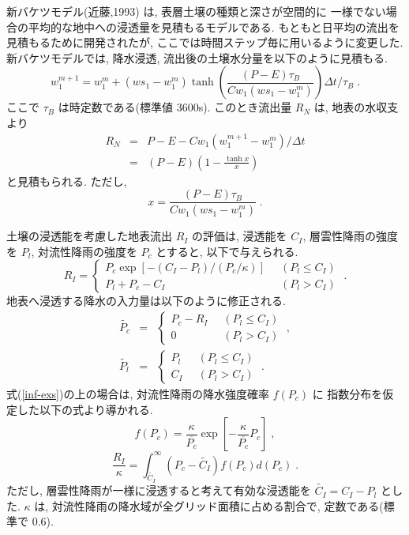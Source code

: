 新バケツモデル(近藤,1993) は, 表層土壌の種類と深さが空間的に
一様でない場合の平均的な地中への浸透量を見積もるモデルである. 
もともと日平均の流出を見積もるために開発されたが, 
ここでは時間ステップ毎に用いるように変更した. 
%
新バケツモデルでは, 降水浸透, 流出後の土壌水分量を以下のように見積もる. 
\begin{equation}
w_1^{m+1} = w_1^m + ( ws_1 - w_1^m ) 
\tanh\left( \frac{(P-E)\tau_B}{Cw_1(ws_1 - w_1^m)} \right) 
\Delta t / \tau_B \; .
\end{equation}
ここで $\tau_B$ は時定数である(標準値 3600s). 
%
このとき流出量 $R_N$ は, 地表の水収支より
\begin{eqnarray}
     R_N & = & P - E - Cw_1 ( w_1^{m+1} - w_1^m ) / \Delta t \\
         & = & (P - E) \left( 1 - \frac{\tanh x}{x} \right)
\end{eqnarray}
と見積もられる. 
ただし,
\begin{equation}
  x = \frac{(P-E)\tau_B}{Cw_1(ws_1 - w_1^m)} \; .
\end{equation}

土壌の浸透能を考慮した地表流出 $R_I$ の評価は, 浸透能を $C_I$, 
層雲性降雨の強度を $P_l$, 対流性降雨の強度を $P_c$ とすると, 
以下で与えられる. 
\begin{equation}
  R_I = \left\{
    \begin{array}{ll}
       P_c \exp [ -(C_I-P_l) / (P_c/\kappa) ] & \;\; ( P_l \le C_I ) \\
       P_l + P_c - C_I                        & \;\; ( P_l > C_I ) 
    \end{array}
  \right. \; .
  \label{inf-exs}
\end{equation}
地表へ浸透する降水の入力量は以下のように修正される. 
\begin{eqnarray}
  \widetilde{P_c} &=& \left\{
    \begin{array}{ll}
      P_c - R_I & \;\; ( P_l \le C_I ) \\
      0            & \;\; ( P_l > C_I )
    \end{array}
  \right. \; , \\
  \widetilde{P_l} &=& \left\{
    \begin{array}{ll}
      P_l  & \;\; ( P_l \le C_I ) \\
      C_I & \;\; ( P_l > C_I )
    \end{array}
  \right. \; .
\end{eqnarray}
式(\ref{inf-exs})の上の場合は, 対流性降雨の降水強度確率 $f(P_c)$ に
指数分布を仮定した以下の式より導かれる. 
\begin{equation}
  f(P_c) = \frac{\kappa}{\overline{P_c}} 
            \exp\left[-\frac{\kappa}{\overline{P_c}}P_c\right] \; ,
\end{equation}
\begin{equation}
  \frac{R_I}{\kappa} = \int_{\widetilde{C_I}}^{\infty}
                        (P_c-\widetilde{C_I})f(P_c) d(P_c) \; .
\end{equation}
ただし, 層雲性降雨が一様に浸透すると考えて有効な浸透能を
$\widetilde{C_I} = C_I - P_l$ とした. 
$\kappa$ は, 対流性降雨の降水域が全グリッド面積に占める割合で, 
定数である(標準で 0.6). 

